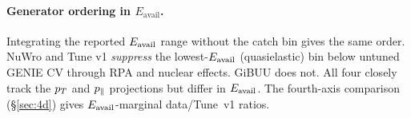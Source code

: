 \paragraph{Generator ordering in $E_{\mathrm{avail}}$.} Integrating the reported $E_{\mathrm{avail}}$ range without the catch bin gives the same order. NuWro and Tune v1 \emph{suppress} the lowest-$E_{\mathrm{avail}}$ (quasielastic) bin below untuned GENIE CV through RPA and nuclear effects. GiBUU does not. All four closely track the $p_{T}$ and $p_{\parallel}$ projections but differ in $E_{\mathrm{avail}}$. The fourth-axis comparison (\S\ref{sec:4d}) gives $E_{\mathrm{avail}}$-marginal data/Tune~v1 ratios.

